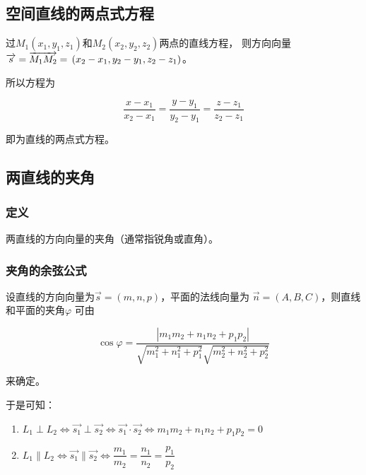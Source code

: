 \documentclass[
	11pt, %
	a4paper, %
]{WhuSakuraBook}
\begin{document}
\subsection{空间直线的两点式方程}

    过\(M_1\left(x_1, y_1, z_1\right)\)和\(M_2\left(x_2, y_2, z_2\right)\)两点的直线方程，
    则方向向量\(\overrightarrow{s} = \overrightarrow{M_{1}M_{2}} = \\
    \left(x_2-x_1, y_2-y_1, z_2-z_1\right)\)。

    所以方程为

    \begin{equation}
        \frac{x-x_1}{x_2-x_1}=\frac{y-y_1}{y_2-y_1}=\frac{z-z_1}{z_2-z_1}
    \end{equation}

    即为直线的两点式方程。

\subsection{两直线的夹角}

\subsubsection*{定义}

    两直线的方向向量的夹角（通常指锐角或直角）。

\subsubsection*{夹角的余弦公式}

    设直线的方向向量为\(\overrightarrow{s} = \left(m, n, p\right)\)，平面的法线向量为
    \(\overrightarrow{n} = \left(A, B, C\right)\)，则直线和平面的夹角\(\varphi\)
    可由

    \begin{equation}
        \cos \varphi=\frac{\left|m_1 m_2+n_1 n_2+p_1 p_2\right|}{\sqrt{m_1^2+n_1^2+p_1^2} \sqrt{m_2^2+n_2^2+p_2^2}}
    \end{equation}

    来确定。

    于是可知：

    \begin{enumerate}
        \item \(L_1 \perp L_2 \Leftrightarrow \overrightarrow{s_1} \perp \overrightarrow{s_2}
            \Leftrightarrow \overrightarrow{s_1} \cdot \overrightarrow{s_2} \Leftrightarrow
            m_1 m_2+n_1 n_2+p_1 p_2 = 0\)
        \item \(L_1 \parallel L_2 \Leftrightarrow \overrightarrow{s_1} \parallel \overrightarrow{s_2}
        \Leftrightarrow \dfrac{m_1}{m_2}=\dfrac{n_1}{n_2}=\dfrac{p_1}{p_2}\)
    \end{enumerate}
\end{document}
